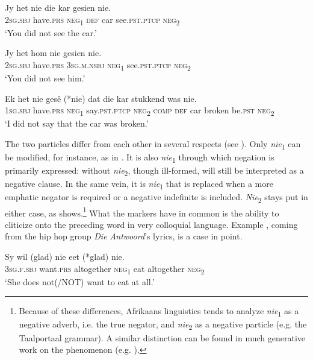 \documentclass[output=paper,colorlinks,citecolor=brown]{langscibook}
\begin{document}
    \ex\label{ex:afr:3b}
        \gll Jy het nie die kar gesien nie. \\
             \textsc{2sg.sbj} have\textsc{.prs} \textsc{neg}\textsubscript{1} \textsc{def} car  see.\textsc{pst.ptcp} \textsc{neg}\textsubscript{2}\\
        \glt ‘You did not see the car.’
    
    \ex\label{ex:afr:3c}
        \gll Jy het hom nie gesien nie. \\ 
             2\textsc{sg.sbj} have.\textsc{prs} \textsc{3sg.m.nsbj} \textsc{neg}\textsubscript{1} see.\textsc{pst.ptcp}  \textsc{neg}\textsubscript{2} \\
        \glt ‘You did not see him.’
    
    \ex\label{ex:afr:3d}
        \gll Ek het nie gesê (*nie) dat die kar stukkend was nie. \\
             \textsc{1sg.sbj} have.\textsc{prs} \textsc{neg}\textsubscript{1} say.\textsc{pst.ptcp}  \textsc{neg}\textsubscript{2} \textsc{comp}  \textsc{def} car  broken be.\textsc{pst} \textsc{neg}\textsubscript{2}\\
        \glt ‘I did not say that the car was broken.’
    \z
\z 


The two particles differ from each other in several respects (see \citealt[3--4]{BiberauerCyrino2009}). Only \textit{nie}\textsubscript{1} can be modified, for instance, as in . It is also \textit{nie}\textsubscript{1} through which negation is primarily expressed:  without \textit{nie}\textsubscript{2}, though ill-formed, will still be interpreted as a negative clause. In the same vein, it is \textit{nie}\textsubscript{1} that is replaced when a more emphatic negator is required or a negative indefinite is included. \textit{Nie}\textsubscript{2} stays put in either case, as  shows.\footnote{Because of these differences, Afrikaans linguistics tends to analyze \textit{nie}\textsubscript{1} as a negative adverb, i.e. the true negator, and \textit{nie}\textsubscript{2} as a negative particle (e.g. the Taalportaal grammar). A similar distinction can be found in much generative work on the phenomenon (e.g. \citealt{Oosthuizen1998}).} What the markers have in common is the ability to cliticize onto the preceding word in very colloquial language. Example , coming from the hip hop group \textit{Die Antwoord}’s lyrics, is a case in point.

\ea\label{ex:afr:4}
    
    \ea\label{ex:afr:4a}
        \gll Sy wil (glad) nie eet (*glad) nie. \\ 
             3\textsc{sg.f.sbj} want\textsc{.prs} altogether \textsc{neg}\textsubscript{1} eat altogether  \textsc{neg}\textsubscript{2} \\
        \glt ‘She does not(/NOT) want to eat at all.’
    
\end{document}

